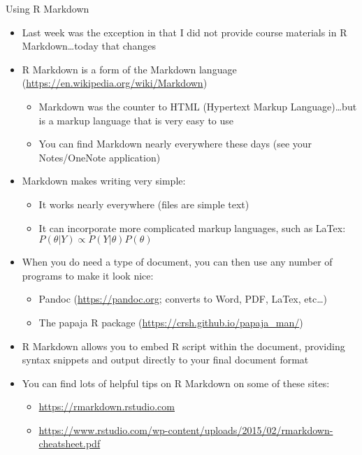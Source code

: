 \documentclass[ignorenonframetext,]{beamer}
\providecommand{\tightlist}{%
  \setlength{\itemsep}{0pt}\setlength{\parskip}{0pt}}
\begin{document}
\begin{frame}{Using R Markdown}

\begin{itemize}
\item
  Last week was the exception in that I did not provide course materials
  in R Markdown\ldots{}today that changes
\item
  R Markdown is a form of the Markdown language
  (\url{https://en.wikipedia.org/wiki/Markdown})

  \begin{itemize}
  \tightlist
  \item
    Markdown was the counter to HTML (Hypertext Markup
    Language)\ldots{}but is a markup language that is very easy to use
  \item
    You can find Markdown nearly everywhere these days (see your
    Notes/OneNote application)
  \end{itemize}
\item
  Markdown makes writing very simple:

  \begin{itemize}
  \tightlist
  \item
    It works nearly everywhere (files are simple text)
  \item
    It can incorporate more complicated markup languages, such as LaTex:
    \(P \left(\theta|Y \right) \propto P \left(Y|\theta \right) P \left( \theta \right)\)
  \end{itemize}
\item
  When you do need a type of document, you can then use any number of
  programs to make it look nice:

  \begin{itemize}
  \tightlist
  \item
    Pandoc (\url{https://pandoc.org}; converts to Word, PDF, LaTex,
    etc\ldots{})
  \item
    The papaja R package (\url{https://crsh.github.io/papaja_man/})
  \end{itemize}
\item
  R Markdown allows you to embed R script within the document, providing
  syntax snippets and output directly to your final document format
\item
  You can find lots of helpful tips on R Markdown on some of these
  sites:

  \begin{itemize}
  \tightlist
  \item
    \url{https://rmarkdown.rstudio.com}
  \item
    \url{https://www.rstudio.com/wp-content/uploads/2015/02/rmarkdown-cheatsheet.pdf}
  \end{itemize}
\end{itemize}

\end{frame}
\end{document}
